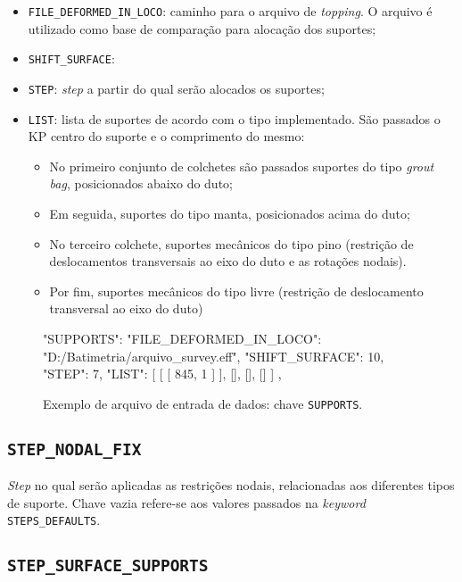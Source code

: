 \begin{itemize}
  \item \texttt{FILE\_DEFORMED\_IN\_LOCO}: caminho para o arquivo de \textit{topping}. O arquivo é utilizado como base de comparação para alocação dos suportes;
  \item \texttt{SHIFT\_SURFACE}: %
  \item \texttt{STEP}: \textit{step} a partir do qual serão alocados os suportes;
  \item \texttt{LIST}: lista de suportes de acordo com o tipo implementado. São passados o KP centro do suporte e o comprimento do mesmo:
  \begin{itemize}
    \item No primeiro conjunto de colchetes são passados suportes do tipo \textit{grout bag}, posicionados abaixo do duto;
    \item Em seguida, suportes do tipo manta, posicionados acima do duto;
    \item No terceiro colchete, suportes mecânicos do tipo pino (restrição de deslocamentos transversais ao eixo do duto e as rotações nodais).
    \item Por fim, suportes mecânicos do tipo livre (restrição de deslocamento transversal ao eixo do duto)
  \end{itemize}
\end{itemize}

\begin{figure}
\caption{Exemplo de arquivo de entrada de dados: chave \texttt{SUPPORTS}.\label{lst:supports}}
\begin{jsoncode}
{
  "SUPPORTS": {
    "FILE_DEFORMED_IN_LOCO": "D:/Batimetria/arquivo_survey.eff",
    "SHIFT_SURFACE": 10,
    "STEP": 7,
    "LIST": [
      [
        [
          845,
          1
        ]
      ],
      [],
      [],
      []
    ]
  },
}
\end{jsoncode}
\end{figure}


\subsection{\texttt{STEP\_NODAL\_FIX}}

\textit{Step} no qual serão aplicadas as restrições nodais, relacionadas aos diferentes tipos de suporte. Chave vazia refere-se aos valores passados na \textit{keyword} \texttt{STEPS\_DEFAULTS}.

\subsection{\texttt{STEP\_SURFACE\_SUPPORTS}}

